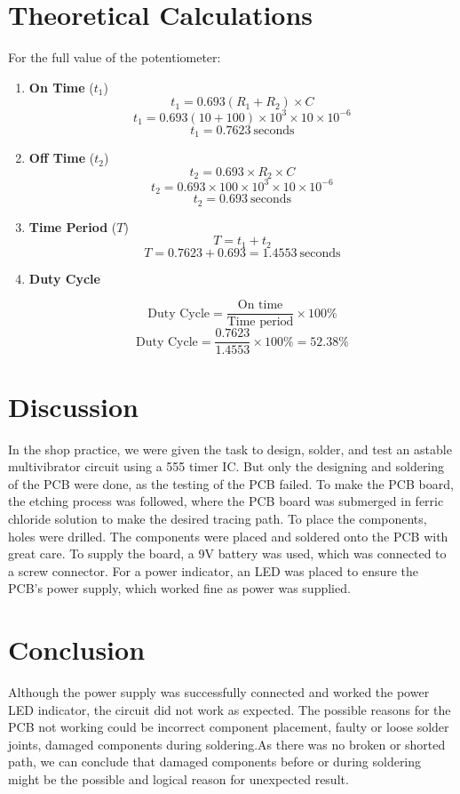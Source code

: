 \documentclass[a4paper,12pt]{article}
\begin{document}
\section{Theoretical Calculations}

For the full value of the potentiometer:
\begin{enumerate}
	\item \textbf{ On Time} (\( t_1 \))
	\[
	t_1 = 0.693(R_1 + R_2) \times C
	\]
	\[
	t_1 = 0.693(10 + 100) \times 10^3 \times 10 \times 10^{-6}
	\]
	\[
	t_1 = 0.7623 \ \text{seconds}
	\]
	\item \textbf{Off Time} (\( t_2 \))
	\[
	t_2 = 0.693 \times R_2 \times C
	\]
	\[
	t_2 = 0.693 \times 100 \times 10^3 \times 10 \times 10^{-6}
	\]
	\[
	t_2 = 0.693 \ \text{seconds}
	\]
	\item \textbf{Time Period} (\( T \))
	\[
	T = t_1 + t_2
	\]
	\[
	T = 0.7623 + 0.693 = 1.4553 \ \text{seconds}
	\]
	
	\item \textbf{Duty Cycle}
	
	\[
	\text{Duty Cycle} = \frac{\text{On time}}{\text{Time period}} \times 100\%
	\]
	\[
	\text{Duty Cycle} = \frac{0.7623}{1.4553} \times 100\% = 52.38\%
	\]
	
\end{enumerate}



\section{Discussion}
In the shop practice, we were given the task to design, solder, and test an astable multivibrator circuit using a 555 timer IC. But only the designing and soldering of the PCB were done, as the testing of the PCB failed. To make the PCB board, the etching process was followed, where the PCB board was submerged in ferric chloride solution to make the desired tracing path. To place the components, holes were drilled. The components were placed and soldered onto the PCB with great care. To supply the board, a 9V battery was used, which was connected to a screw connector. For a power indicator, an LED was placed to ensure the PCB's power supply, which worked fine as power was supplied.
\section{Conclusion}

 Although the power supply was successfully connected and worked the power LED indicator, the circuit did not work as expected. The possible reasons for the PCB not working could be incorrect component placement, faulty or loose solder joints, damaged components during soldering.As there was no broken or shorted path, we can conclude that damaged components before or during soldering might be the possible and logical reason for unexpected result.
\end{document}
